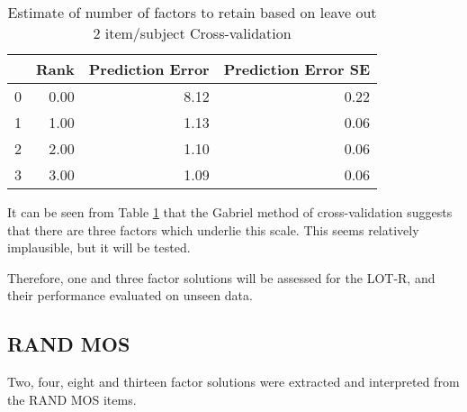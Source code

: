 \documentclass{article}
\begin{document}
\begin{table}[ht]
\centering
\begin{tabular}{rrrr}
  \hline
 & Rank & Prediction Error & Prediction Error SE \\ 
  \hline
0 & 0.00 & 8.12 & 0.22 \\ 
  1 & 1.00 & 1.13 & 0.06 \\ 
  2 & 2.00 & 1.10 & 0.06 \\ 
  3 & 3.00 & 1.09 & 0.06 \\ 
   \hline
\end{tabular}
\caption{Estimate of number of factors to retain based on leave out 2 item/subject Cross-validation} 
\label{tab:lotrfactgabriel}
\end{table}
It can be seen from Table \ref{tab:lotrfactgabriel} that the Gabriel method of cross-validation suggests that there are three factors which underlie this scale. This seems relatively implausible, but it will be tested. 

Therefore, one and three factor solutions will be assessed for the LOT-R, and their performance evaluated on unseen data. 






\subsection{RAND MOS}
\label{sec:rand-mos-1}
Two, four, eight and thirteen factor solutions were extracted and interpreted from the RAND MOS items. 
\end{document}
